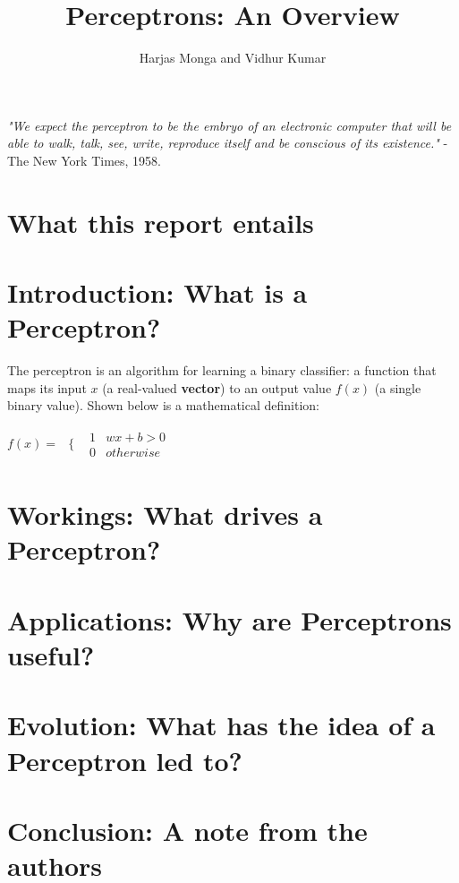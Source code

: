 \documentclass[12pt, titlepage, a4paper]{article}
\title{Perceptrons: An Overview}
\author{Harjas Monga and Vidhur Kumar}
\begin{document}
	\maketitle
	
	\tableofcontents
	
	\newpage

	\textit{"We expect the perceptron to be the embryo of an electronic computer that will be able to walk, talk, see, write, reproduce itself and be conscious of its existence."} - The New York Times, 1958.	
	
	\section{What this report entails}
			
	
	\section{Introduction: What is a Perceptron?}
	
	The perceptron is an algorithm for learning a binary classifier: a function that maps its input $x$ (a real-valued \textbf{vector}) to an output value $f(x)$ (a single binary value). Shown below is a mathematical definition: \\
	
	\begin{center}
		$f(x) = $
		$
\begin{array}{cc}
  \{ & 
    \begin{array}{cc}
    	1 & wx + b > 0 \\
    	0 & otherwise
    \end{array}
\end{array}
		$
	\end{center}
	
	\section{Workings: What drives a Perceptron?}
		
	\section{Applications: Why are Perceptrons useful?}
	
	
	\section{Evolution: What has the idea of a Perceptron led to?}
	
	\section{Conclusion: A note from the authors}
\end{document}

